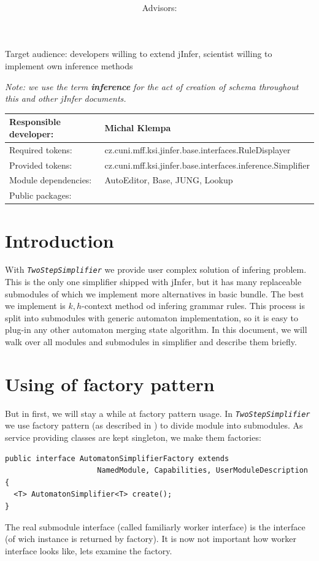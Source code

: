 \documentclass[a4paper,10pt,oneside]{article}
\title{\bf\mftitle}
\author{\mfauthor \\ Advisors: \mfadvisor}
\date{\mfplacedate}
\newcommand{\code}[1]{\texttt{\StrSubstitute{#1}{.}{.\.}}}
\def\.{\discretionary{}{}{}}
\newcommand{\jmodule}[1]{\texttt{\textit{#1}}}
\begin{document}
\maketitle
\noindent Target audience: developers willing to extend jInfer, scientist willing to implement own inference methods

\noindent \emph{Note: we use the term \textbf{inference} for the act of creation of schema throughout this and other jInfer documents.}

\noindent \begin{tabular}{|l|l|} \hline
Responsible developer: & Michal Klempa \\ \hline
Required tokens:       & cz.cuni.mff.ksi.jinfer.base.interfaces.RuleDisplayer \\ \hline
Provided tokens:       & cz.cuni.mff.ksi.jinfer.base.interfaces.inference.Simplifier \\ \hline
Module dependencies:   & AutoEditor, Base, JUNG, Lookup \\ \hline
Public packages:       & \\ \hline
\end{tabular}

\section{Introduction}
With \jmodule{TwoStepSimplifier} we provide user complex solution of infering problem.
This is the only one simplifier shipped with jInfer, but it has many replaceable submodules of which we implement more alternatives in basic bundle.
The best we implement is \cite{ahonen} $k,h$-context method od infering grammar rules.
This process is split into submodules with generic automaton implementation, so it is easy to plug-in any other automaton merging state algorithm.
In this document, we will walk over all modules and submodules in simplifier and describe them briefly.

\section{Using of factory pattern}
But in first, we will stay a while at factory pattern usage.
In \jmodule{TwoStepSimplifier} we use factory pattern (as described in \cite{archdoc}) to divide module into submodules.
As service providing classes are kept singleton, we make them factories:
\begin{verbatim}
public interface AutomatonSimplifierFactory extends 
                     NamedModule, Capabilities, UserModuleDescription {
  <T> AutomatonSimplifier<T> create();
}
\end{verbatim}
The real submodule interface (called familiarly worker interface) is the \code{AutomatonSimplifier<T>} interface (of wich instance is returned by factory). It is now not important how worker interface looks like, lets examine the factory.
\end{document}

